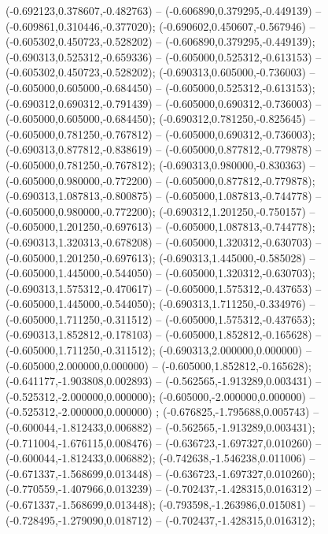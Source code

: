  (-0.692123,0.378607,-0.482763) -- (-0.606890,0.379295,-0.449139) -- (-0.609861,0.310446,-0.377020);
 (-0.690602,0.450607,-0.567946) -- (-0.605302,0.450723,-0.528202) -- (-0.606890,0.379295,-0.449139);
 (-0.690313,0.525312,-0.659336) -- (-0.605000,0.525312,-0.613153) -- (-0.605302,0.450723,-0.528202);
 (-0.690313,0.605000,-0.736003) -- (-0.605000,0.605000,-0.684450) -- (-0.605000,0.525312,-0.613153);
 (-0.690312,0.690312,-0.791439) -- (-0.605000,0.690312,-0.736003) -- (-0.605000,0.605000,-0.684450);
 (-0.690312,0.781250,-0.825645) -- (-0.605000,0.781250,-0.767812) -- (-0.605000,0.690312,-0.736003);
 (-0.690313,0.877812,-0.838619) -- (-0.605000,0.877812,-0.779878) -- (-0.605000,0.781250,-0.767812);
 (-0.690313,0.980000,-0.830363) -- (-0.605000,0.980000,-0.772200) -- (-0.605000,0.877812,-0.779878);
 (-0.690313,1.087813,-0.800875) -- (-0.605000,1.087813,-0.744778) -- (-0.605000,0.980000,-0.772200);
 (-0.690312,1.201250,-0.750157) -- (-0.605000,1.201250,-0.697613) -- (-0.605000,1.087813,-0.744778);
 (-0.690313,1.320313,-0.678208) -- (-0.605000,1.320312,-0.630703) -- (-0.605000,1.201250,-0.697613);
 (-0.690313,1.445000,-0.585028) -- (-0.605000,1.445000,-0.544050) -- (-0.605000,1.320312,-0.630703);
 (-0.690313,1.575312,-0.470617) -- (-0.605000,1.575312,-0.437653) -- (-0.605000,1.445000,-0.544050);
 (-0.690313,1.711250,-0.334976) -- (-0.605000,1.711250,-0.311512) -- (-0.605000,1.575312,-0.437653);
 (-0.690313,1.852812,-0.178103) -- (-0.605000,1.852812,-0.165628) -- (-0.605000,1.711250,-0.311512);
 (-0.690313,2.000000,0.000000) -- (-0.605000,2.000000,0.000000) -- (-0.605000,1.852812,-0.165628);
 (-0.641177,-1.903808,0.002893) -- (-0.562565,-1.913289,0.003431) -- (-0.525312,-2.000000,0.000000);
 (-0.605000,-2.000000,0.000000) -- (-0.525312,-2.000000,0.000000) ;
 (-0.676825,-1.795688,0.005743) -- (-0.600044,-1.812433,0.006882) -- (-0.562565,-1.913289,0.003431);
 (-0.711004,-1.676115,0.008476) -- (-0.636723,-1.697327,0.010260) -- (-0.600044,-1.812433,0.006882);
 (-0.742638,-1.546238,0.011006) -- (-0.671337,-1.568699,0.013448) -- (-0.636723,-1.697327,0.010260);
 (-0.770559,-1.407966,0.013239) -- (-0.702437,-1.428315,0.016312) -- (-0.671337,-1.568699,0.013448);
 (-0.793598,-1.263986,0.015081) -- (-0.728495,-1.279090,0.018712) -- (-0.702437,-1.428315,0.016312);
